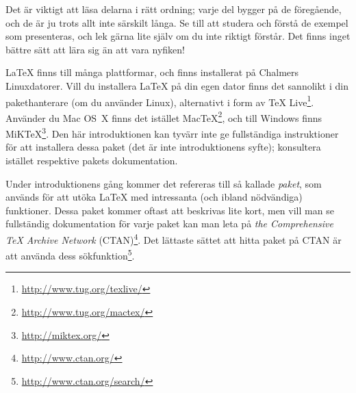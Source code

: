 \documentclass[../../a4.tex]{subfiles}
\begin{document}
\newpage %
Det är viktigt att läsa delarna i rätt ordning; varje del bygger på de
föregående, och de är ju trots allt inte särskilt långa. Se till att
studera och förstå de exempel som presenteras, och lek gärna lite själv
om du inte riktigt förstår. Det finns inget bättre sätt att lära sig än
att vara nyfiken!

\LaTeX{} finns till många plattformar, och finns installerat på Chalmers
Linux\-da\-to\-rer. Vill du installera \LaTeX{} på din egen dator finns det
sannolikt i din pakethanterare (om du använder Linux), alternativt i form
av \TeX{} Live\footnote{\url{http://www.tug.org/texlive/}}. Använder du
Mac OS~X finns det istället
Mac\TeX\footnote{\url{http://www.tug.org/mactex/}}, och till Windows finns
MiK\TeX\footnote{\url{http://miktex.org/}}. Den här introduktionen kan
tyvärr inte ge fullständiga instruktioner för att installera dessa paket
(det är inte introduktionens syfte);
konsultera istället respektive pakets dokumentation.

Under introduktionens gång kommer det refereras till så kallade
\emph{paket}, som används för att utöka \LaTeX{} med intressanta (och
ibland nödvändiga) funktioner. Dessa paket kommer oftast att beskrivas
lite kort, men vill man se fullständig dokumentation för varje paket
kan man leta på \emph{the Comprehensive \TeX{} Archive Network}
(CTAN)\footnote{\url{http://www.ctan.org/}\label{sec:ctan}}.
Det lättaste sättet att hitta paket på CTAN är att använda dess
sökfunktion\footnote{\url{http://www.ctan.org/search/}}.
\end{document}
